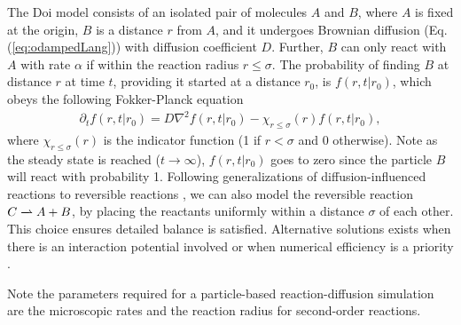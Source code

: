 \documentclass[10pt,twocolumn]{revtex4-1}
\begin{document}
	The Doi model consists of an isolated pair of molecules $A$ and $B$, where $A$ is fixed at the origin, $B$ is a distance $r$ from $A$, and it undergoes Brownian diffusion (Eq. (\ref{eq:odampedLang})) with diffusion coefficient $D$. Further, $B$ can only react with $A$ with rate $\alpha$ if within the reaction radius $r\leq \sigma$. The probability of finding $B$ at distance $r$ at time $t$, providing it started at a distance $r_0$, is $f(r,t|r_0)$, which obeys the following Fokker-Planck equation
	\begin{align*}
	\partial_{t}f(r,t|r_0) = D \nabla^2 f(r,t|r_0) - \chi_{r\leq \sigma}(r) f(r,t|r_0),
	\end{align*} 
	where $\chi_{r\leq \sigma}(r)$ is the indicator function (1 if $r<\sigma$ and 0 otherwise). Note as the steady state is reached ($t\rightarrow \infty$), $f(r,t|r_0)$ goes to zero since the particle $B$ will react with probability 1. Following generalizations of diffusion-influenced reactions to reversible reactions \cite{agmon1984diffusion, agmon1990theory, cavallo2019reversible, del2014fluorescence, del2016discrete, frohner2018reversible, gopich2002kinetics, khokhlova2012comparison, kim1999exact}, we can also model the reversible reaction $C\xrightharpoonup[]{} A + B$, by placing the reactants uniformly within a distance $\sigma$ of each other. This choice ensures detailed balance is satisfied. Alternative solutions exists when there is an interaction potential involved \cite{frohner2018reversible} or when numerical efficiency is a priority \cite{andrews2004stochastic}. 
	
	Note the parameters required for a particle-based reaction-diffusion simulation are the microscopic rates and the reaction radius for second-order reactions. 
	
	
\end{document}
